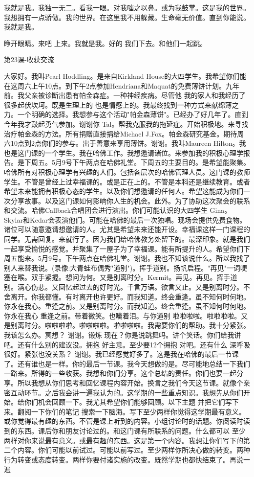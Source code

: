 我就是我。我独一无二。看我一眼。对我嗤之以鼻。或为我鼓掌。这是我的世界。我想拥有一点骄傲。我的世界。在这里我不用躲藏。生命毫无价值。直到你能说。我就是我。 

睁开眼睛。来吧 上来。我就是我。好的 我们下去。和他们一起跳。 

第23课-收获交流 

大家好。我叫Pearl Hoddling。是来自Kirkland House的大四学生。我希望你们能在这周六上午10点。到下午2点参加Hendriana和Maquat的免费薄饼计划。九年前。我父亲被诊断出患有帕金森症。一种神经疾病。尽管他 我的家人和我经历了很多起伏坎坷。既是生理上的 也是情感上的。我最终找到一种方式来献绵薄之力。一个明确的选择。我想参与这个活动"帕金森薄饼"。已经办了好几年了。直到今年我才鼓起勇气参加。谢谢你 Tal。帮我克服我的拖延症。开始积极地。来寻找治疗帕金森的方法。所有捐赠直接捐给Michael J.Fox。帕金森研究基金。期待周六10点到2点你们的参与。出于善意来享用薄饼。谢谢。我叫Maureen Hilton。我也是这门课的一个学生。我在哈佛工作。我想邀请诸位。来参加我的积极心理学报告。是下周五。5月9号下午两点在哈佛礼堂。下周五的主要目的。是希望能聚集。哈佛所有对积极心理学有兴趣的人们。包括各层次的哈佛管理人员。这门课的教师 学生。不管是曾经上过幸福课的。或是正在上的。不管是本科还是继续教育。或者希望未来能拥有积极心态的学生。以及你们想邀请的任何人。希望这能成为你们一次分享故事。以及这门课如何影响你人生的机会。此外。为了协助这次聚会的联系和交流。哈佛Callback合唱团会进行演出。你们可能认识的大四学生 Gina。Skylar和Kedar会表演他们。可能在哈佛的最后一次独唱。现场会提供免费食物。诸位可以随意邀请想邀请的人。尤其是希望未来还能开设。幸福课这样一门课程的同学。无需回复。来就行了。因为我们给哈佛教务处留下的。最深印象。就是我们一起享受愉悦的感觉。并聚集了一屋子为了幸福课。能有所提升的人。希望你们下周五能来。5月9号。下午两点在哈佛礼堂。谢谢。我也不知该说什么。所以我找了别人来替我说。(录像:大青蛙布偶秀"道别")。挥手道别。扬帆启程。"再见"一词哽塞在喉。双手紧握。想问为何。又是别离时分。Kermit。再见。再见。挥手道别。满心伤悲。又回忆起过去的好时光。千言万语。欲言又止。又是别离时分。不舍离开。你我都懂。有时离开也许更好。而我知道。终会重逢。虽不知何时何地。你永在我心。重逢之前。又是别离时分。而我知道。终会重逢。虽不知何时何地。你永在我心 重逢之前。带着微笑。也噙着泪。与你道别 啦啦啦啦。啦啦啦啦。又是别离时分。啦啦啦啦。啦啦啦啦。啦啦啦啦。我需要你们的帮助。我十分紧张。我该怎么办。冥想？ 谢谢。锻炼 现在？你是说跳舞吗。讲个笑话。你们给我讲吧。还有什么别的建议没。拥抱 好主意。至少要12个拥抱 对吧。还有什么 深呼吸 很好。紧张也没关系？ 谢谢。我已经感觉好多了。这是我在哈佛的最后一节课了。还有谁也是一样。你的最后一节课。我今天想做的是。尽可能地总结一下我们一路来。所得的一些收获。我想和你们分享。这个总结的责任。你们也要一起分享。所以我想从你们思考和回忆课程内容开始。换言之我们今天这节课。就像个亲密互动环节。之后我会讲一遍我认为的。这学期的一些重点知识。我想先从你们开始。给你们机会回顾一下。我尤其希望你们能够回顾。以下主题 并把它们写下来。翻阅一下你们的笔记 搜索一下脑海。写下至少两样你觉得这学期最有意义。或你觉得最有趣的东西。不管是课上听到的内容。小组讨论时的话题。你阅读时读到的东西。课后你和朋友讨论过的。和这门课有所联系的问题。什么都可以 至少两样对你来说最有意义。或最有趣的东西。这是第一个内容。我想让你们写下的第二个内容。你们可能以前试过。可能以前写过。至少两样你所决心做的转变。两种行为转变或态度转变。两样你要付诸实施的改变。既然学期也都快结束了。再说一遍 